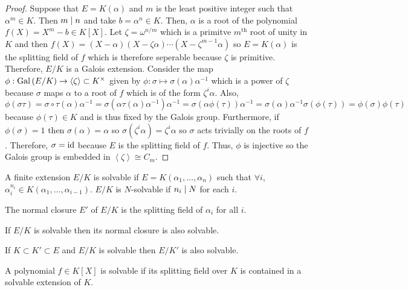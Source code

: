 \documentclass[12pt]{extarticle}
\begin{document}
\begin{proof}
Suppose that $E = K(\alpha)$ and $m$ is the least positive integer such that $\alpha^m \in K$. Then $m \mid n$ and take $b = \alpha^n \in K$. Then, $\alpha$ is a root of the polynomial $f(X) = X^m - b \in K[X]$. Let $\zeta = \omega^{n/m}$ which is a primitve $m^{\mathrm{th}}$ root of unity in $K$ and then $f(X) = (X - \alpha)(X - \zeta \alpha) \cdots (X - \zeta^{m-1} \alpha)$ so $E = K(\alpha)$ is the splitting field of $f$ which is therefore seperable because $\zeta$ is primitive. Therefore, $E/K$ is a Galois extension. Consider the map $\phi : \mathrm{Gal}\left( E/K \right) \to \left< \zeta \right> \subset K^\times$ given by $\phi : \sigma \mapsto \sigma(\alpha) \alpha^{-1}$ which is a power of $\zeta$ because $\sigma$ maps $\alpha$ to a root of $f$ which is of the form $\zeta^i \alpha$. Also, \[\phi(\sigma \tau) = \sigma \circ \tau(\alpha) \alpha^{-1} = \sigma(\alpha \tau(\alpha) \alpha^{-1}) \alpha^{-1} = \sigma(\alpha \phi(\tau)) \alpha^{-1} = \sigma(\alpha) \alpha^{-1} \sigma(\phi(\tau)) = \phi(\sigma) \phi(\tau)\] because $\phi(\tau) \in K$ and is thus fixed by the Galois group. Furthermore, if $\phi(\sigma) = 1$ then $\sigma(\alpha) = \alpha$ so $\sigma(\zeta^i \alpha) = \zeta^i \alpha$ so $\sigma$ acts trivially on the roots of $f$. Therefore, $\sigma = \mathrm{id} $ because $E$ is the splitting field of $f$. Thus, $\phi$ is injective so the Galois group is embedded in $\left< \zeta \right> \cong C_m$. 
\end{proof}

\begin{definition}
A finite extension $E/K$ is solvable if $E = K(\alpha_1, \dots, \alpha_n)$ such that $\forall i$, $\alpha_i^{n_i} \in K(\alpha_1, \dots, \alpha_{i-1})$. $E/K$ is $N$-solvable if $n_i \mid N$ for each $i$. 
\end{definition}

\begin{definition}
The normal closure $E'$ of $E/K$ is the splitting field of $\alpha_i$ for all $i$.
\end{definition}

\begin{proposition}
If $E/K$ is solvable then its normal closure is also solvable.
\end{proposition}

\begin{proposition}
If $K \subset K' \subset E$ and $E/K$ is solvable then $E/K'$ is also solvable.
\end{proposition}

\begin{definition}
A polynomial $f \in K[X]$ is solvable if its splitting field over $K$ is contained in a solvable extension of $K$.
\end{definition}
\end{document}

